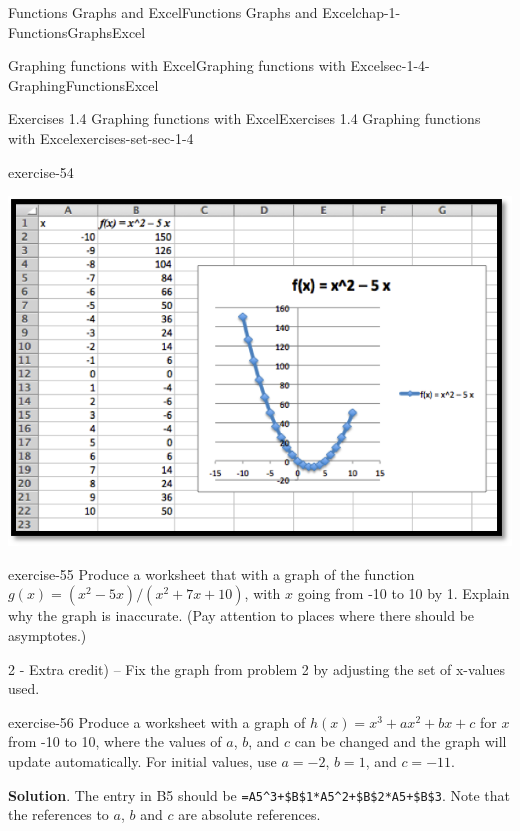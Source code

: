 \documentclass[oneside,10pt,]{book}
\newcommand{\mono}[1]{\texttt{#1}}
\numberwithin{equation}{section}
\begin{document}
\begin{chapterptx}{Functions Graphs and Excel}{}{Functions Graphs and Excel}{}{}{chap-1-FunctionsGraphsExcel}
\begin{sectionptx}{Graphing functions with Excel}{}{Graphing functions with Excel}{}{}{sec-1-4-GraphingFunctionsExcel}
\begin{exercises-subsection-numberless}{Exercises 1.4 Graphing functions with Excel}{}{Exercises 1.4 Graphing functions with Excel}{}{}{exercises-set-sec-1-4}
\begin{divisionexercise}{1}{}{}{exercise-54}
\begin{sidebyside}{1}{0.1}{0.1}{0}
\begin{sbspanel}{0.8}
\includegraphics[width=1\linewidth]{images/sec1-4-sol1a.png}
\end{sbspanel}%
\end{sidebyside}%
\end{divisionexercise}%
\begin{divisionexercise}{2}{}{}{exercise-55}%
\hypertarget{p-343}{}%
Produce a worksheet that with a graph of the function \(g(x) = (x^2 - 5 x)/(x^2 + 7 x + 10)\), with \(x\) going from -10 to 10 by 1.  Explain why the graph is inaccurate.  (Pay attention to places where there should be asymptotes.)%
\par
\hypertarget{p-344}{}%
2\textasteriskcentered{} - Extra credit) – Fix the graph from problem 2 by adjusting the set of x-values used.%
\end{divisionexercise}%
\begin{divisionexercise}{3}{}{}{exercise-56}%
\hypertarget{p-345}{}%
Produce a worksheet with a graph of \(h(x) = x^3 + a x^2 + b x + c\) for \(x\) from -10 to 10, where the values of \(a\), \(b\), and \(c\) can be changed and the graph will update automatically.  For initial values, use \(a = -2\), \(b = 1\), and \(c = -11\).%
\par\smallskip%
\noindent\textbf{Solution}.\hypertarget{solution-28}{}\quad%
\hypertarget{p-346}{}%
The entry in B5 should be \mono{=A5\textasciicircum{}3+\$B\$1*A5\textasciicircum{}2+\$B\$2*A5+\$B\$3}. Note that the references to \(a\), \(b\) and \(c\) are absolute references.%
\begin{sidebyside}{1}{0}{0}{0}%
\begin{sbspanel}{1}%

\end{sbspanel}
\end{sidebyside}
\end{divisionexercise}
\end{exercises-subsection-numberless}
\end{sectionptx}
\end{chapterptx}
\end{document}
